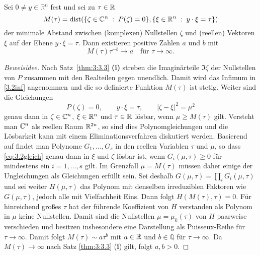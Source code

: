 \begin{lem}\label{3.2lem1}
Sei $0\neq y \in \mathbb R^n$ fest und sei zu $\tau\in\mathbb R$
\begin{equation}\label{3.2inf}
M(\tau) = \operatorname{dist}( \{ \zeta\in\mathbb C^n\;:\; P(\zeta)=0\} , \{ \xi\in\mathbb R^n \;:\; y\cdot\xi=\tau\} )
\end{equation}
der minimale Abstand zwischen (komplexen) Nullstellen $\zeta$ und (reellen) Vektoren $\xi$ auf der Ebene $y\cdot\xi=\tau$.
Dann existieren positive Zahlen $a$ und $b$ mit
\begin{equation}\label{3.2to}
M(\tau) \tau^{-b} \to a\quad \text{für } \tau \to \infty.
\end{equation}
\end{lem}
\begin{proof}[Beweisidee] Nach Satz~\ref{thm:3:3.3} {\bf (i)} streben die Imaginärteile $\Im\zeta$ der Nullstellen von $P$ zusammen mit den Realteilen gegen unendlich. Damit wird das Infimum in \eqref{3.2inf} angenommen und die so definierte Funktion $M(\tau)$ ist stetig. Weiter sind die Gleichungen
\begin{equation}\label{eq:3.2gleich}
  P(\zeta)=0,\qquad y\cdot\xi=\tau,\qquad |\zeta-\xi|^2=\mu^2
\end{equation}
genau dann in $\zeta\in\mathbb C^n$, $\xi\in\mathbb R^n$ und $\tau\in\mathbb R$ lösbar, wenn $\mu\ge M(\tau)$ gilt. Versteht man $\mathbb C^n$ als reellen Raum $\mathbb R^{2n}$, so sind dies Polynomgleichungen und die Lösbarkeit kann mit einem Eliminationsverfahren diskutiert werden. Basierend auf \cite{Seidenberg:1954} findet man Polynome
$G_1,\dots, G_s$ in den reellen Variablen $\tau$ und $\mu$, so dass \eqref{eq:3.2gleich} genau dann in $\xi$ und $\zeta$ lösbar ist, wenn $G_i(\mu,\tau)\ge0$ für mindestens ein $i=1,\ldots,s$ gilt. Im Grenzfall $\mu=M(\tau)$ müssen daher einige der Ungleichungen als Gleichungen erfüllt sein. Sei deshalb $G(\mu,\tau)=\prod_i G_i(\mu,\tau)$ und sei weiter $H(\mu,\tau)$ das Polynom mit denselben irreduziblen Faktoren wie $G(\mu,\tau)$, jedoch alle mit Vielfachheit Eins. Dann folgt
$H(M(\tau),\tau)=0$. Für hinreichend großes $\tau$ hat der führende Koeffizient von $H$ verstanden als Polynom in $\mu$ keine Nullstellen. Damit sind die Nullstellen $\mu=\mu_k(\tau)$ von $H$ paarweise verschieden und  besitzen insbesondere eine Darstellung als Puisseux-Reihe für $\tau\to\infty$. Damit folgt
$M(\tau)\sim a \tau^b$ mit $a\in\mathbb R$ und $b\in\mathbb Q$ für $\tau\to\infty$. Da $M(\tau)\to\infty$ nach Satz \ref{thm:3:3.3} ({\bf i})  gilt, folgt $a,b>0$.
\end{proof}
  

